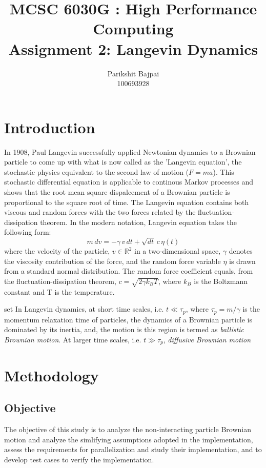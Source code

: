 \documentclass[11pt, oneside]{article}
\title{MCSC 6030G : High Performance Computing \\ Assignment 2: Langevin Dynamics}
\author{Parikshit Bajpai \\ 100693928}
\date{}							%
\begin{document}
\maketitle

\section{Introduction}
In 1908, Paul Langevin successfully applied Newtonian dynamics to a Brownian particle to come up with what is now called as the 'Langevin equation', the stochastic physics equivalent to the second law of motion (\(F=ma\)). This stochastic differential equation is applicable to continous Markov processes and shows that the root mean square dispalcement of a Brownian particle is proportional to the square root of time. The Langevin equation contains both viscous and random forces with the two forces related by the fluctuation-dissipation theorem. In the modern notation, Langevin equation takes the following form:     
  \begin{equation} \label{Langevin}
    m\,dv = - \gamma\,v\,dt + \sqrt{dt}\,c\,\eta(t) 
  \end{equation}
  where the velocity of the particle, \(v \in \mathbb{R}^2\) in a two-dimensional space, \(\gamma\)  denotes the viscosity contribution of the force, and the random force variable \(\eta\) is drawn from a standard normal distribution. The random force  coefficient equals, from the fluctuation-dissipation theorem, \(c = \sqrt{2 \gamma k_B T}\), where \(k_B\) is the Boltzmann constant and T is the temperature.

set  In Langevin dynamics, at short time scales, i.e. \(t \ll \tau_p \), where \(\tau_p =  m / \gamma \) is the momentum relaxation time of particles, the dynamics of a Brownian particle is dominated by its inertia, and, the motion is this region is termed as \textit{ballistic Brownian motion}. At larger time scales, i.e.  \(t \gg  \tau_p\),  \textit{diffusive Brownian motion}
  
\section{Methodology}
\subsection{Objective}
The objective of this study is to analyze the non-interacting particle Brownian motion and analyze the simlifying assumptions adopted in the implementation, assess the requirements for parallelization and study their implementation, and to develop test cases to verify the implementation. 
\end{document}
